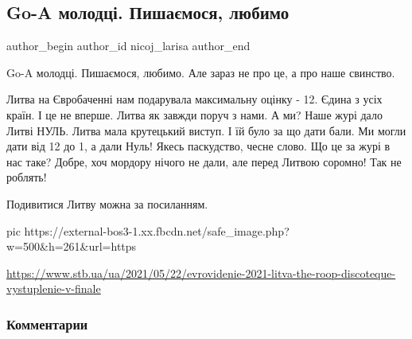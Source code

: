  
 
 
 
 
 
\subsection{Go-A молодці. Пишаємося, любимо}
\label{sec:23_05_2021.fb.nicoj_larisa.1.goa_evrovidenie}
\ifcmt
 author_begin
   author_id nicoj_larisa
 author_end
\fi

Go-A молодці. Пишаємося, любимо. Але зараз не про це, а про наше свинство.

Литва на Євробаченні нам подарувала максимальну оцінку - 12. Єдина з усіх
країн. І це не вперше. Литва як завжди поруч з нами. А ми? Наше журі дало Литві
НУЛЬ. Литва мала крутецький виступ. І їй було за що дати бали. Ми могли дати
від 12 до 1, а дали Нуль! Якесь паскудство, чесне слово. Що це за журі в нас
таке? Добре, хоч мордору нічого не дали, але перед Литвою соромно! Так не
роблять!

Подивитися Литву можна за посиланням.

\ifcmt
  pic https://external-bos3-1.xx.fbcdn.net/safe_image.php?w=500&h=261&url=https%
\fi

\url{https://www.stb.ua/ua/2021/05/22/evrovidenie-2021-litva-the-roop-discoteque-vystuplenie-v-finale}

\subsubsection{Комментарии}

